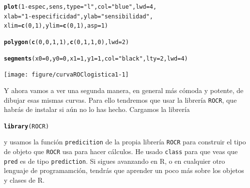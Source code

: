 \documentclass[10pt,a4paper]{article}\usepackage[]{graphicx}\usepackage[]{color}
\makeatletter
\newcommand{\hlnum}[1]{\textcolor[rgb]{0.686,0.059,0.569}{#1}}%
\newcommand{\hlstr}[1]{\textcolor[rgb]{0.192,0.494,0.8}{#1}}%
\newcommand{\hlopt}[1]{\textcolor[rgb]{0,0,0}{#1}}%
\newcommand{\hlstd}[1]{\textcolor[rgb]{0.345,0.345,0.345}{#1}}%
\newcommand{\hlkwc}[1]{\textcolor[rgb]{0.333,0.667,0.333}{#1}}%
\newcommand{\hlkwd}[1]{\textcolor[rgb]{0.737,0.353,0.396}{\textbf{#1}}}%
\newenvironment{kframe}{%
 \def\at@end@of@kframe{}%
 \ifinner\ifhmode%
  \def\at@end@of@kframe{\end{minipage}}%
  \begin{minipage}{\columnwidth}%
 \fi\fi%
 \def\FrameCommand##1{\hskip\@totalleftmargin \hskip-\fboxsep
 \colorbox{shadecolor}{##1}\hskip-\fboxsep
     \hskip-\linewidth \hskip-\@totalleftmargin \hskip\columnwidth}%
 \MakeFramed {\advance\hsize-\width
   \@totalleftmargin\z@ \linewidth\hsize
   \@setminipage}}%
 {\par\unskip\endMakeFramed%
 \at@end@of@kframe}
\newenvironment{knitrout}{}{} %
\makeatother
\begin{document}
\begin{knitrout}
\color{fgcolor}\begin{kframe}
\begin{alltt}
\hlkwd{plot}\hlstd{(}\hlnum{1}\hlopt{-} \hlstd{espec, sens,} \hlkwc{type} \hlstd{=} \hlstr{"l"}\hlstd{,} \hlkwc{col}\hlstd{=}\hlstr{"blue"}\hlstd{,} \hlkwc{lwd}\hlstd{=}\hlnum{4}\hlstd{,}
     \hlkwc{xlab}\hlstd{=}\hlstr{"1 - especificidad"}\hlstd{,} \hlkwc{ylab}\hlstd{=}\hlstr{"sensibilidad"}\hlstd{,}
     \hlkwc{xlim}\hlstd{=}\hlkwd{c}\hlstd{(}\hlnum{0}\hlstd{,} \hlnum{1}\hlstd{),} \hlkwc{ylim}\hlstd{=}\hlkwd{c}\hlstd{(}\hlnum{0}\hlstd{,} \hlnum{1}\hlstd{),} \hlkwc{asp}\hlstd{=}\hlnum{1}\hlstd{)}

\hlkwd{polygon}\hlstd{(}\hlkwd{c}\hlstd{(}\hlnum{0}\hlstd{,} \hlnum{0}\hlstd{,} \hlnum{1}\hlstd{,} \hlnum{1}\hlstd{),} \hlkwd{c}\hlstd{(}\hlnum{0}\hlstd{,} \hlnum{1}\hlstd{,} \hlnum{1}\hlstd{,} \hlnum{0}\hlstd{),} \hlkwc{lwd}\hlstd{=}\hlnum{2}\hlstd{)}

\hlkwd{segments}\hlstd{(}\hlkwc{x0} \hlstd{=} \hlnum{0}\hlstd{,} \hlkwc{y0} \hlstd{=} \hlnum{0}\hlstd{,} \hlkwc{x1} \hlstd{=} \hlnum{1}\hlstd{,} \hlkwc{y1} \hlstd{=} \hlnum{1}\hlstd{,} \hlkwc{col}\hlstd{=}\hlstr{"black"}\hlstd{,} \hlkwc{lty}\hlstd{=}\hlnum{2}\hlstd{,} \hlkwc{lwd}\hlstd{=}\hlnum{4}\hlstd{)}
\end{alltt}
\end{kframe}

{\centering \texttt{[image: figure/curvaROClogistica1-1]} 

}



\end{knitrout}



Y ahora vamos a ver una segunda manera, en general más cómoda y potente, de dibujar esas mismas curvas. Para ello tendremos que usar la librería {\tt ROCR}, que habrás de instalar si aún no lo has hecho. Cargamos la librería


\begin{knitrout}
\color{fgcolor}\begin{kframe}
\begin{alltt}
\hlkwd{library}\hlstd{(ROCR)}
\end{alltt}
\end{kframe}
\end{knitrout}

y usamos la función {\tt predicition} de la propia librería {\tt ROCR} para construir el tipo de objeto que {\tt ROCR} usa para hacer cálculos. He usado {\tt class} para que veas que {\tt pred} es de tipo {\tt prediction}. Si sigues avanzando en R, o en cualquier otro lenguaje de programamción, tendrás que aprender un poco más sobre los objetos y clases de R.
\end{document}
